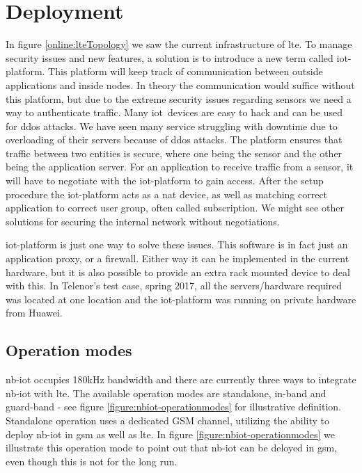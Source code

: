 \documentclass[USenglish]{ifimaster}  %
\begin{document}
\section{Deployment} \label{section:nb-iot-deployment} %
In figure \vref{online:lteTopology} we saw the current infrastructure of \acrshort{lte}. To manage security issues and new features, a solution is to introduce a new term called \acrfull{iot-platform}. This platform will keep track of communication between outside applications and inside nodes. In theory the communication would suffice without this platform, but due to the extreme security issues regarding sensors we need a way to authenticate traffic. Many \acrshort{iot} devices are easy to hack and can be used for \acrfull{ddos} attacks. We have seen many service struggling with downtime due to overloading of their servers because of \acrshort{ddos} attacks. The platform ensures that traffic between two entities is secure, where one being the sensor and the other being the application server. For an application to receive traffic from a sensor, it will have to negotiate with the \acrshort{iot-platform} to gain access. After the setup procedure the \acrshort{iot-platform} acts as a \acrshort{nat} device, as well as matching correct application to correct user group, often called subscription. We might see other solutions for securing the internal network without negotiations.

\acrshort{iot-platform} is just one way to solve these issues. This software is in fact just an application proxy, or a firewall. Either way it can be implemented in the current hardware, but it is also possible to provide an extra rack mounted device to deal with this. In Telenor's test case, spring 2017, all the servers/hardware required was located at one location and the \acrshort{iot-platform} was running on private hardware from Huawei.

\subsection{Operation modes}
\acrshort{nb-iot} occupies 180kHz bandwidth and there are currently three ways to integrate \acrshort{nb-iot} with \acrshort{lte}. The available operation modes are standalone, in-band and guard-band - see figure \vref{figure:nbiot-operationmodes} for illustrative definition. Standalone operation uses a dedicated GSM channel, utilizing the ability to deploy \acrshort{nb-iot} in \acrshort{gsm} as well as \acrshort{lte}. In figure \vref{figure:nbiot-operationmodes} we illustrate this operation mode to point out that \acrshort{nb-iot} can be deloyed in \acrshort{gsm}, even though this is not for the long run.
\end{document}
